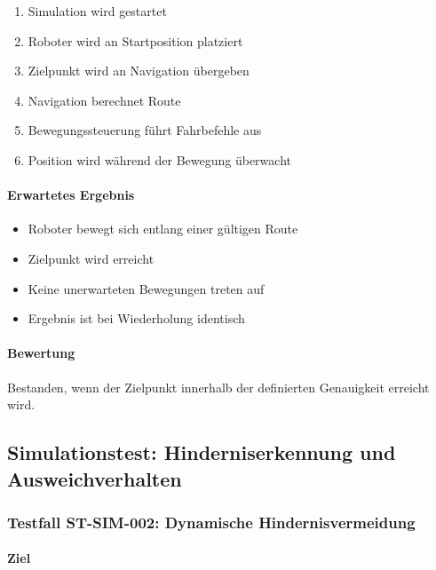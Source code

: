 \documentclass[
  a4paper,
  12pt,
  DIV=12,        %
  parskip=half,  %
  headings=small %
]{scrartcl}
\theoremstyle{definition}
\providecommand{\tightlist}{%
  \setlength{\itemsep}{0pt}\setlength{\parskip}{0pt}}
\theoremstyle{definition}
\begin{document}
\begin{enumerate}
\def\labelenumi{\arabic{enumi}.}
\tightlist
\item
  Simulation wird gestartet
\item
  Roboter wird an Startposition platziert
\item
  Zielpunkt wird an Navigation übergeben
\item
  Navigation berechnet Route
\item
  Bewegungssteuerung führt Fahrbefehle aus
\item
  Position wird während der Bewegung überwacht
\end{enumerate}

\paragraph{Erwartetes Ergebnis}\label{erwartetes-ergebnis-16}

\begin{itemize}
\tightlist
\item
  Roboter bewegt sich entlang einer gültigen Route
\item
  Zielpunkt wird erreicht
\item
  Keine unerwarteten Bewegungen treten auf
\item
  Ergebnis ist bei Wiederholung identisch
\end{itemize}

\paragraph{Bewertung}\label{bewertung-16}

Bestanden, wenn der Zielpunkt innerhalb der definierten Genauigkeit
erreicht wird.

\subsection{Simulationstest: Hinderniserkennung und
Ausweichverhalten}\label{simulationstest-hinderniserkennung-und-ausweichverhalten}

\subsubsection{Testfall ST-SIM-002: Dynamische
Hindernisvermeidung}\label{testfall-st-sim-002-dynamische-hindernisvermeidung}

\paragraph{Ziel}\label{ziel-17}
\end{document}
